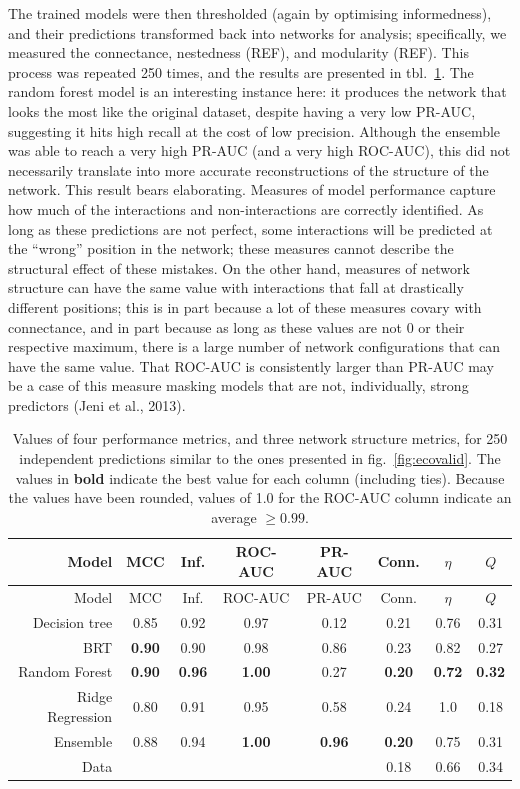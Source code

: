 \documentclass[10pt,oneside]{article}
\begin{document}
The trained models were then thresholded (again by optimising
informedness), and their predictions transformed back into networks for
analysis; specifically, we measured the connectance, nestedness (REF),
and modularity (REF). This process was repeated 250 times, and the
results are presented in tbl.~\ref{tbl:comparison}. The random forest
model is an interesting instance here: it produces the network that
looks the most like the original dataset, despite having a very low
PR-AUC, suggesting it hits high recall at the cost of low precision.
Although the ensemble was able to reach a very high PR-AUC (and a very
high ROC-AUC), this did not necessarily translate into more accurate
reconstructions of the structure of the network. This result bears
elaborating. Measures of model performance capture how much of the
interactions and non-interactions are correctly identified. As long as
these predictions are not perfect, some interactions will be predicted
at the ``wrong'' position in the network; these measures cannot describe
the structural effect of these mistakes. On the other hand, measures of
network structure can have the same value with interactions that fall at
drastically different positions; this is in part because a lot of these
measures covary with connectance, and in part because as long as these
values are not 0 or their respective maximum, there is a large number of
network configurations that can have the same value. That ROC-AUC is
consistently larger than PR-AUC may be a case of this measure masking
models that are not, individually, strong predictors (Jeni et al.,
2013).

\hypertarget{tbl:comparison}{}
\begin{longtable}[]{@{}rccccccc@{}}
\caption{\label{tbl:comparison}Values of four performance metrics, and
three network structure metrics, for 250 independent predictions similar
to the ones presented in fig.~\ref{fig:ecovalid}. The values in
\textbf{bold} indicate the best value for each column (including ties).
Because the values have been rounded, values of 1.0 for the ROC-AUC
column indicate an average \(\ge 0.99\).}\tabularnewline
\toprule
Model & MCC & Inf. & ROC-AUC & PR-AUC & Conn. & \(\eta\) &
\(Q\)\tabularnewline
\midrule
\endfirsthead
\toprule
Model & MCC & Inf. & ROC-AUC & PR-AUC & Conn. & \(\eta\) &
\(Q\)\tabularnewline
\midrule
\endhead
Decision tree & 0.85 & 0.92 & 0.97 & 0.12 & 0.21 & 0.76 &
0.31\tabularnewline
BRT & \textbf{0.90} & 0.90 & 0.98 & 0.86 & 0.23 & 0.82 &
0.27\tabularnewline
Random Forest & \textbf{0.90} & \textbf{0.96} & \textbf{1.00} & 0.27 &
\textbf{0.20} & \textbf{0.72} & \textbf{0.32}\tabularnewline
Ridge Regression & 0.80 & 0.91 & 0.95 & 0.58 & 0.24 & 1.0 &
0.18\tabularnewline
Ensemble & 0.88 & 0.94 & \textbf{1.00} & \textbf{0.96} & \textbf{0.20} &
0.75 & 0.31\tabularnewline
Data & & & & & 0.18 & 0.66 & 0.34\tabularnewline
\bottomrule
\end{longtable}
\end{document}
